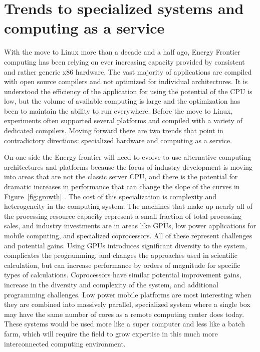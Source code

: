\section{Trends to specialized systems and computing as a service}
\label{sec:comp-clouds}

With the move to Linux more than a decade and a half ago, Energy Frontier computing has been relying on ever increasing capacity provided by consistent and rather generic x86 hardware.    The vast majority of applications are compiled with open source compilers and not optimized for individual architectures.   It is understood the efficiency of the application for using the potential of the CPU is low, but the volume of available computing is large and the optimization has been to maintain the ability to run everywhere.  Before the move to Linux, experiments often supported several platforms and compiled with a variety of dedicated compilers.     Moving forward there are two trends that point in contradictory directions: specialized hardware and computing as a service. 

On one side the Energy frontier will need to evolve to use alternative computing architectures and platforms because the focus of industry development is moving into areas that are not the classic server CPU, and there is the potential for dramatic increases in performance that can change the slope of the curves in Figure~\ref{fig:growth} .   The cost of this specialization is complexity and heterogeneity in the computing system.  The machines that make up nearly all of the processing resource capacity represent a small fraction of total processing sales, and industry investments are in areas like GPUs, low power applications for mobile computing, and specialized coprocessors.    All of these represent challenges and potential gains.   Using GPUs introduces significant diversity to the system, complicates the programming, and changes the approaches used in scientific calculation, but can increase performance by orders of magnitude for specific types of calculations.    Coprocessors have similar potential improvement gains, increase in the diversity and complexity of the system, and additional programming challenges.   Low power mobile platforms are most interesting when they are combined into massively parallel, specialized system where a single box may have the same number of cores as a remote computing center does today.   These systems would be used more like a super computer and less like a batch farm, which will require the field to grow expertise in this much more interconnected computing environment.  


